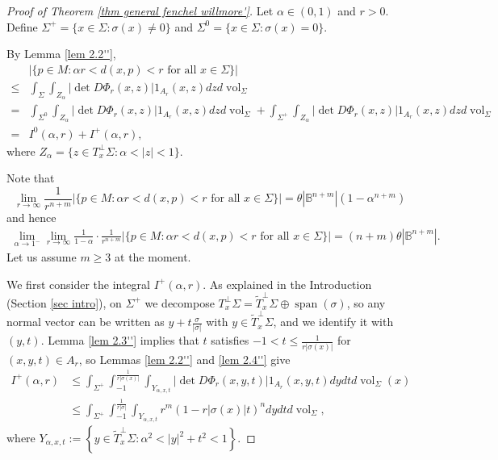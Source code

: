 \documentclass[11pt, reqno]{amsart}
\numberwithin{equation}{section}
\begin{document}
\begin{proof}[Proof of Theorem \ref{thm general fenchel willmore'}]
Let $\alpha\in(0, 1)$ and $r>0$. Define $\Sigma^+=\{x\in \Sigma: \sigma(x)\ne 0\}$ and $\Sigma^0=\{x\in \Sigma: \sigma(x) =0\}$.

By Lemma \ref{lem 2.2''},
\begin{equation}\label{ineq est I0 I+}
\begin{aligned}
& |\{p \in M: \alpha r<d(x, p)<r \text { for all } x \in \Sigma\} | \\
\le & \int_{\Sigma} \int_{Z_\alpha}\left|\det D\Phi_r(x, z)\right| 1_{A_r}(x, z) dz d \operatorname{vol}_{\Sigma} \\
=& \int_{\Sigma^0} \int_{Z_\alpha}\left|\det D\Phi_r(x, z)\right| 1_{A_r}(x, z) dz d \operatorname{vol}_{\Sigma}
+ \int_{\Sigma^+} \int_{Z_\alpha}\left|\det D\Phi_r(x, z)\right| 1_{A_r}(x, z) dz d \operatorname{vol}_{\Sigma}\\
=& I^0(\alpha, r)+I^+(\alpha, r),
\end{aligned}
\end{equation}
where $Z_\alpha=\{z\in T_x^\perp \Sigma: \alpha<|z|<1\}$.

Note that
\begin{equation*}
\lim_{r\to\infty}\frac{1}{r^{n+m}}|\{p \in M: \alpha r<d(x, p)<r \text { for all } x \in \Sigma\} |=\theta\left|\mathbb{B}^{n+m}\right|\left(1-\alpha^{n+m}\right)
\end{equation*}
and hence
\begin{equation}\label{avr}
\begin{split}
\lim_{\alpha\to1^-}\lim_{r\to\infty}\frac{1}{1-\alpha}\cdot\frac{1}{r^{n+m}}|\{p \in M: \alpha r<d(x, p)<r \text { for all } x \in \Sigma\} |=(n+m)\theta\left|\mathbb{B}^{n+m}\right|.
\end{split}
\end{equation}
Let us assume $m \ge 3$ at the moment.

We first consider the integral $I^+(\alpha, r)$.
As explained in the Introduction (Section \ref{sec intro}), on $\Sigma^{+}$ we decompose $T_x^{\perp} \Sigma=\widetilde{T}_x^{\perp} \Sigma \oplus \operatorname{span}(\sigma)$, so any normal vector can be written as $y+t \frac{\sigma}{|\sigma|}$ with $y \in \widetilde{T}_x^{\perp} \Sigma$, and we identify it with $(y, t)$.
Lemma \ref{lem 2.3''} implies that
$t$ satisfies $-1<t \le \frac{1}{r|\sigma(x)|}$ for $(x, y, t)\in A_r$, so Lemmas \ref{lem 2.2''} and \ref{lem 2.4''} give
\begin{equation}\label{ineq I+}
\begin{aligned}
I^+(\alpha, r) & \le \int_{\Sigma^+} \int_{-1}^{\frac{1}{r|\sigma(x)|}} \int_{Y_{\alpha, x, t}}\left|\det D \Phi_r(x, y, t)\right| 1_{A_r}(x, y, t) d y d t d \operatorname{vol}_{\Sigma} (x)\\
& \le \int_{\Sigma^+} \int_{-1}^{\frac{1}{r|\sigma|}} \int_{Y_{\alpha, x, t}} r^m(1-r|\sigma(x)| t)^n d y d t d \operatorname{vol}_{\Sigma},
\end{aligned}
\end{equation}
where $Y_{\alpha, x, t}:=\left\{y \in \widetilde{T}_x^{\perp} \Sigma: \alpha^2<|y|^2+t^2<1\right\}$.


\end{proof}
\end{document}
